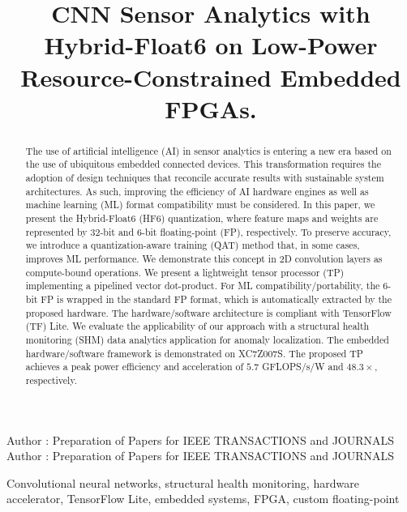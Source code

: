 \title {CNN Sensor Analytics with Hybrid-Float6 on Low-Power Resource-Constrained Embedded FPGAs.}



\markboth
{Author \headeretal: Preparation of Papers for IEEE TRANSACTIONS and JOURNALS}
{Author \headeretal: Preparation of Papers for IEEE TRANSACTIONS and JOURNALS}


\begin{abstract}
The use of artificial intelligence (AI) in sensor analytics is entering a new era based on the use of ubiquitous embedded connected devices. This transformation requires the adoption of design techniques that reconcile accurate results with sustainable system architectures. As such, improving the efficiency of AI hardware engines as well as machine learning (ML) format compatibility must be considered. In this paper, we present the Hybrid-Float6 (HF6) quantization, where feature maps and weights are represented by 32-bit and 6-bit floating-point (FP), respectively. To preserve accuracy, we introduce a quantization-aware training (QAT) method that, in some cases, improves ML performance. We demonstrate this concept in 2D convolution layers as compute-bound operations. We present a lightweight tensor processor (TP) implementing a pipelined vector dot-product. For ML compatibility/portability, the 6-bit FP is wrapped in the standard FP format, which is automatically extracted by the proposed hardware. The hardware/software architecture is compliant with TensorFlow (TF) Lite. We evaluate the applicability of our approach with a structural health monitoring (SHM) data analytics application for anomaly localization. The embedded hardware/software framework is demonstrated on XC7Z007S. The proposed TP achieves a peak power efficiency and acceleration of $5.7$ GFLOPS/s/W and $48.3\times$, respectively.
\end{abstract}

\begin{keywords}
Convolutional neural networks, structural health monitoring, hardware accelerator, TensorFlow Lite, embedded systems, FPGA, custom floating-point
\end{keywords}

\titlepgskip=-15pt

\maketitle